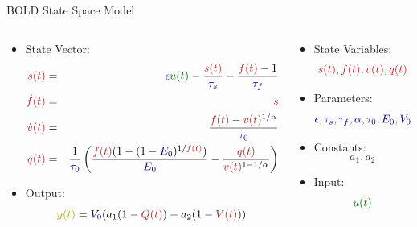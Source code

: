\documentclass{beamer}
\begin{document}
\begin{frame}{BOLD State Space Model}
  \scriptsize
  \begin{columns}
  \begin{column}{.7\textwidth}
    \begin{itemize}
    \item State Vector:
    \begin{eqnarray}
    \color{mblue}\dot{s}(t) &=& {\color{mred}\epsilon} {\color{mgreen}u(t)} - 
                \frac{\color{mblue}s(t)}{\color{mred}\tau_s} - \frac{{\color{mblue}f(t)}-1}{\color{mred}\tau_f} \nonumber \\
    \color{mblue}\dot{f}(t) &=& \color{mblue}s \nonumber \\
    \color{mblue}\dot{v}(t) &=& \frac{{\color{mblue}f(t)} - 
                {\color{mblue}v(t)} ^ {1/{\color{mred}\alpha}}}{\color{mred}\tau_0} \nonumber \\
    \color{mblue}\dot{q}(t) &=& \frac{1}{\color{mred}\tau_0}
            \left(\frac{{\color{mblue}f(t)}(1-(1-{\color{mred}E_0})^{1/\color{mblue}f(t)})}{\color{mred}E_0} -
        \frac{\color{mblue}q(t)}{{\color{mblue}v(t)}^{1-1/\color{mred}\alpha}}\right) \nonumber 
    \end{eqnarray}
    \item Output:
    $${\color{myellow}y(t)} = {\color{mred}V_0}(a_1( 1 - {\color{mblue}Q(t)}) - a_2(1 - {\color{mblue}V(t)}))$$
    \end{itemize}
  \end{column}

  \begin{column}{.3\textwidth}
    \begin{itemize}
        \item State Variables:
        $${\color{mblue}s(t)}, {\color{mblue}f(t)}, {\color{mblue}v(t)}, {\color{mblue}q(t)}$$
        \item Parameters:
        $${\color{mred}\epsilon}, {\color{mred}\tau_s}, {\color{mred}\tau_f}, {\color{mred}\alpha}, 
                    {\color{mred}\tau_0}, {\color{mred}E_0}, {\color{mred}V_0}$$
        \item Constants:
        $$a_1, a_2$$
        \item Input:
        $$\color{mgreen}u(t)$$
    \end{itemize}
  \end{column}
  \end{columns}
\end{frame}
\end{document}
